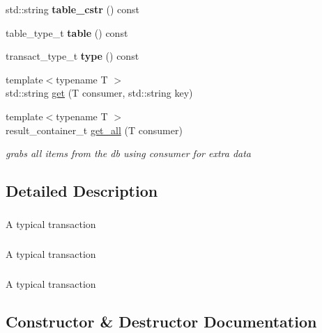 \begin{DoxyCompactItemize}
\mbox{\label{structmods_1_1lmdb_1_1transaction__t_aad6618e385ed22538f860f0d1f2ae3ac}} 
std\+::string {\bfseries table\+\_\+cstr} () const
\item 
\mbox{\label{structmods_1_1lmdb_1_1transaction__t_a812dc866044aead9677b8a4e4e632975}} 
table\+\_\+type\+\_\+t {\bfseries table} () const
\item 
\mbox{\label{structmods_1_1lmdb_1_1transaction__t_ae581e7f664485009158f09151e134988}} 
transact\+\_\+type\+\_\+t {\bfseries type} () const
\item 
{\footnotesize template$<$typename T $>$ }\\std\+::string \hyperlink{structmods_1_1lmdb_1_1transaction__t_a893faeea3f9f9a0875d0522c6c7de5b6}{get} (T consumer, std\+::string key)
\item 
{\footnotesize template$<$typename T $>$ }\\result\+\_\+container\+\_\+t \hyperlink{structmods_1_1lmdb_1_1transaction__t_a89e078b5a572044e71ee239589ea334f}{get\+\_\+all} (T consumer)
\begin{DoxyCompactList}\small\item\em grabs all items from the db using consumer for extra data \end{DoxyCompactList}\end{DoxyCompactItemize}


\subsection{Detailed Description}
\subparagraph*{}

A typical transaction \subparagraph*{}

\subparagraph*{}

A typical transaction \subparagraph*{}

\subparagraph*{}

A typical transaction \subparagraph*{}

\subsection{Constructor \& Destructor Documentation}
\mbox{\label{structmods_1_1lmdb_1_1transaction__t_a37e8dc8e3f9e3f705bdb801d829210ff}} 
